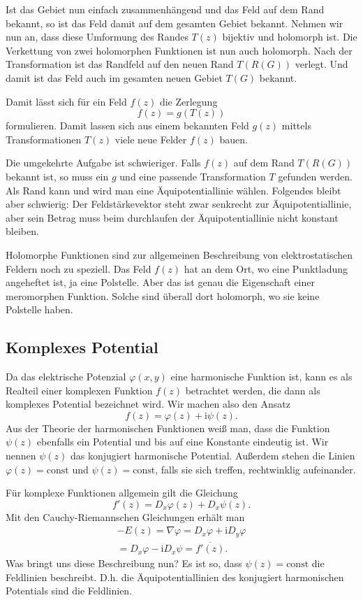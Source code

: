 \documentclass[a4paper,10pt,fleqn,twocolumn,twoside]{article}
\newcommand{\ui}{\mathrm i}
\begin{document}
Ist das Gebiet nun einfach zusammenhängend und das Feld auf dem
Rand bekannt, so ist das Feld damit auf dem gesamten Gebiet bekannt.
Nehmen wir nun an, dass diese Umformung des Randes $T(z)$ bijektiv
und holomorph ist. Die Verkettung von zwei
holomorphen Funktionen ist nun auch holomorph. Nach der
Transformation ist das Randfeld auf den neuen Rand
$T(R(G))$ verlegt. Und damit ist das Feld auch im gesamten neuen
Gebiet $T(G)$ bekannt.

Damit lässt sich für ein Feld $f(z)$ die Zerlegung
\[f(z) = g(T(z))\]
formulieren. Damit lassen sich aus einem bekannten Feld $g(z)$
mittels Transformationen $T(z)$ viele neue Felder $f(z)$ bauen.

Die umgekehrte Aufgabe ist schwieriger. Falls $f(z)$ auf dem
Rand $T(R(G))$ bekannt ist, so muss ein $g$ und eine passende
Transformation $T$ gefunden werden. Als Rand kann und wird man eine
Äquipotentiallinie wählen. Folgendes bleibt aber schwierig: Der
Feldstärkevektor steht zwar senkrecht zur Äquipotentiallinie,
aber sein Betrag muss beim durchlaufen der Äquipotentiallinie
nicht konstant bleiben.

Holomorphe Funktionen sind zur allgemeinen Beschreibung von
elektrostatischen Feldern noch zu speziell. Das Feld $f(z)$ hat
an dem Ort, wo eine Punktladung angeheftet ist, ja eine Polstelle.
Aber das ist genau die Eigenschaft einer meromorphen Funktion. Solche
sind überall dort holomorph, wo sie keine Polstelle haben.


\subsection{Komplexes Potential}

Da das elektrische Potenzial $\varphi(x,y)$ eine harmonische
Funktion ist, kann es als Realteil einer komplexen Funktion $f(z)$
betrachtet werden, die dann als komplexes Potential bezeichnet wird.
Wir machen also den Ansatz
\[f(z) = \varphi(z)+\ui\psi(z).\]
Aus der Theorie der harmonischen Funktionen weiß man, dass die
Funktion $\psi(z)$ ebenfalls ein Potential und bis auf eine
Konstante eindeutig ist. Wir nennen $\psi(z)$ das konjugiert
harmonische Potential. Außerdem stehen die Linien $\varphi(z)=\mathrm{const}$
und $\psi(z)=\mathrm{const}$, falls sie sich treffen,
rechtwinklig aufeinander.

Für komplexe Funktionen allgemein gilt die Gleichung
\[f'(z) = D_x\varphi(z)+D_x\psi(z).\]
Mit den Cauchy-Riemannschen Gleichungen erhält man
\begin{gather*}
-E(z) = \nabla\varphi = D_x\varphi+\ui D_y\varphi\\
= D_x\varphi-\ui D_x\psi = \overline{f'(z)}.
\end{gather*}
Was bringt uns diese Beschreibung nun? Es ist so, dass
$\psi(z)=\mathrm{const}$ die Feldlinien beschreibt. D.h. die
Äquipotentiallinien des konjugiert harmonischen Potentials sind
die Feldlinien.
\end{document}
